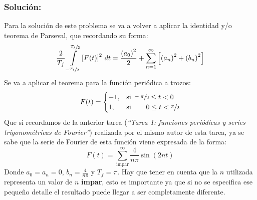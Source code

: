 \begin{multicols}{2}
\subsubsection*{Solución:}

Para la solución de este problema se va a volver a aplicar la identidad y/o teorema de Parseval, que recordando su forma:
\begin{equation*}
    \frac{2}{T_f} \int\limits_{-\sfrac{T_f}{2}}^{\sfrac{T_f}{2}} \left[F(t)\right]^{2} \,dt = \frac{\left(a_0\right)^{2}}{2} + \sum_{n=1}^{\infty} \left[\left(a_n\right)^{2} + \left(b_n\right)^{2}\right]
\end{equation*}
Se va a aplicar el teorema para la función periódica a trozos:
\begin{equation}
    F(t) =
    \begin{cases}
    -1,&\text{si } \sfrac{-\pi}{2} \leq t < 0\\
    1,&\text{si } \hspace{18pt} 0 \leq t < \sfrac{\pi}{2}
    \end{cases}
    \label{pro4:eq1}
\end{equation}
Que si recordamos de la anterior tarea (\textit{``Tarea 1: funciones periódicas y series trigonométricas de Fourier''}) realizada por el mismo autor de esta tarea, ya se sabe que la serie de Fourier de esta función viene expresada de la forma:
\begin{equation}
    F(t) = \sum_{\mathrm{impar}}^{\infty} \frac{4}{n\pi} \sin(2nt) \label{pro4:eq2}
\end{equation}
Donde $a_0 = a_n = 0$, $b_n = \frac{4}{n\pi}$ y $T_f = \pi$. Hay que tener en cuenta que la $n$ utilizada representa un valor de $n$ \textbf{impar}, esto es importante ya que si no se especifica ese pequeño detalle el resultado puede llegar a ser completamente diferente.


\end{multicols}
